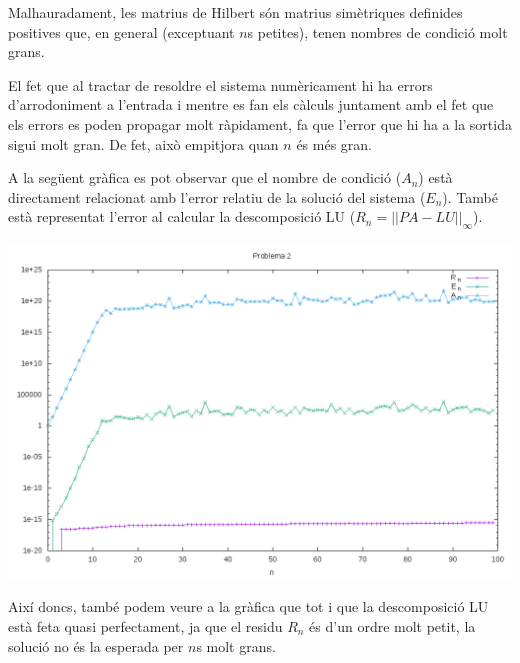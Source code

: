 \documentclass[11pt,a4paper]{article}
\begin{document}
Malhauradament, les matrius de Hilbert són matrius simètriques definides positives que, en general (exceptuant $n$s petites), tenen nombres de condició molt grans.

El fet que al tractar de resoldre el sistema numèricament hi ha errors d'arrodoniment a l'entrada i mentre es fan els càlculs juntament amb el fet que els errors es poden propagar molt ràpidament, fa que l'error que hi ha a la sortida sigui molt gran. De fet, això empitjora quan $n$ és més gran.

A la següent gràfica es pot observar que el nombre de condició ($A_n$) està directament relacionat amb l'error relatiu de la solució del sistema ($E_n$). També està representat l'error al calcular la descomposició LU ($R_n = ||PA - LU||_{\infty}$).

\begin{center}
\includegraphics[scale=0.4]{grafica}
\end{center}

Així doncs, també podem veure a la gràfica que tot i que la descomposició LU està feta quasi perfectament, ja que el residu $R_n$ és d'un ordre molt petit, la solució no és la esperada per $n$s molt grans.
\end{document}
